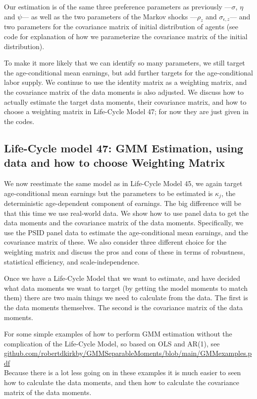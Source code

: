 Our estimation is of the same three preference parameters as previously ---$\sigma$, $\eta$ and $\psi$--- as well as the two parameters of the Markov shocks ---$\rho_z$ and $\sigma_{\epsilon,z}$--- and two parameters for the covariance matrix of initial distribution of agents (see code for explanation of how we parameterize the covariance matrix of the initial distribution).

To make it more likely that we can identify so many parameters, we still target the age-conditional mean earnings, but add further targets for the age-conditional labor supply. We continue to use the identity matrix as a weighting matrix, and the covariance matrix of the data moments is also adjusted. We discuss how to actually estimate the target data moments, their covariance matrix, and how to choose a weighting matrix in Life-Cycle Model 47; for now they are just given in the codes.



\subsection{Life-Cycle model 47: GMM Estimation, using data and how to choose Weighting Matrix}
We now reestimate the same model as in Life-Cycle Model 45, we again target age-conditional mean earnings but the parameters to be estimated is $\kappa_j$, the deterministic age-dependent component of earnings. The big difference will be that this time we use real-world data. We show how to use panel data to get the data moments and the covariance matrix of the data moments. Specifically, we use the PSID panel data to estimate the age-conditional mean earnings, and the covariance matrix of these. We also consider three different choice for the weighting matrix and discuss the pros and cons of these in terms of robustness, statistical efficiency, and scale-independence.

Once we have a Life-Cycle Model that we want to estimate, and have decided what data moments we want to target (by getting the model moments to match them) there are two main things we need to calculate from the data. The first is the data moments themselves. The second is the covariance matrix of the data moments.

For some simple examples of how to perform GMM estimation without the complication of the Life-Cycle Model, so based on OLS and AR(1), see
\\ \href{https://github.com/robertdkirkby/GMMSeparableMoments/blob/main/GMMexamples.pdf}{github.com/robertdkirkby/GMMSeparableMoments/blob/main/GMMexamples.pdf}
\\ Because there is a lot less going on in these examples it is much easier to seen how to calculate the data moments, and then how to calculate the covariance matrix of the data moments.

